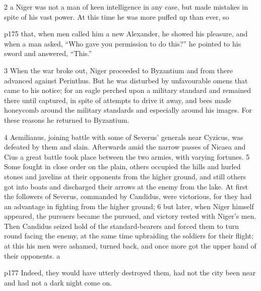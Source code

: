 2 a Niger was not a man of keen intelligence in any case, but made mistakes in spite of his vast power. At this time he was more puffed up than ever, so

p175 that, when men called him a new Alexander, he showed his pleasure, and when a man asked, ``Who gave you permission to do this?'' he pointed to his sword and answered, ``This.''

3
When the war broke out, Niger proceeded to Byzantium and from there advanced against Perinthus. But he was disturbed by unfavourable omens that came to his notice; for an eagle perched upon a military standard and remained there until captured, in spite of attempts to drive it away, and bees made honeycomb around the military standards and especially around his images. For these reasons he returned to Byzantium.

4
Aemilianus, joining battle with some of Severus' generals near Cyzicus, was defeated by them and slain. Afterwards amid the narrow passes of Nicaea and Cius a great battle took place between the two armies, with varying fortunes. 5 Some fought in close order on the plain, others occupied the hills and hurled stones and javelins at their opponents from the higher ground, and still others got into boats and discharged their arrows at the enemy from the lake. At first the followers of Severus, commanded by Candidus, were victorious, for they had an advantage in fighting from the higher ground; 6 but later, when Niger himself appeared, the pursuers became the pursued, and victory rested with Niger's men. Then Candidus seized hold of the standard-bearers and forced them to turn round fa­cing the enemy, at the same time upbraiding the soldiers for their flight; at this his men were ashamed, turned back, and once more got the upper hand of their opponents.\texthebrew{⁠} a

p177 Indeed, they would have utterly destroyed them, had not the city been near and had not a dark night come on.

